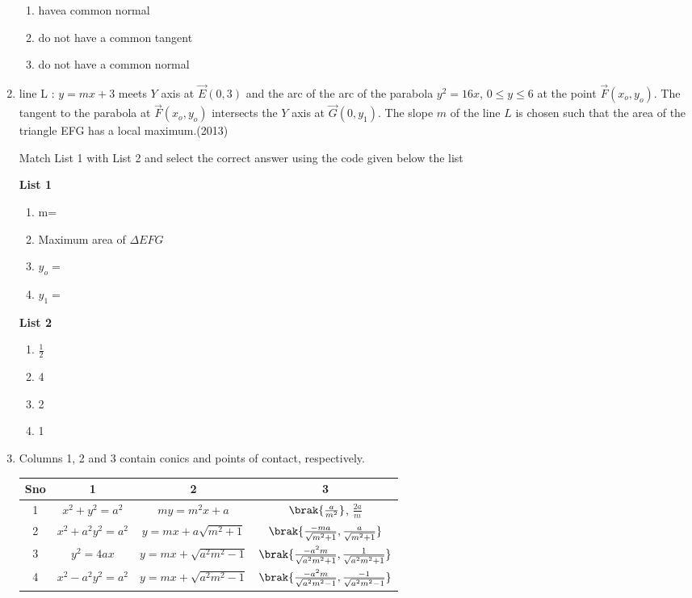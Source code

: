 \begin{enumerate}[label=\thesubsection.\arabic*.,ref=\thesubsection.\theenumi]
\begin{multicols}{2}
\begin{enumerate}
    \item havea common normal 
    \item do not have a common tangent
    \item do not have a common normal
\end{enumerate}
\end{multicols}
\item line L : $y = mx + 3$ meets $Y$ axis at $\vec{E}(0,3)$ and the arc of the arc of the parabola $y^2 = 16x$, $ 0\leq y \leq6$ at the point $\vec{F}(x_o,y_o)$. The tangent to the parabola at $\vec{F}(x_o,y_o)$ intersects the $Y$ axis at $\vec{G}(0,y_1)$. The slope $m$ of the line $L$ is chosen such that the area of the triangle EFG has a local maximum.\hfill{(2013)} 

Match List 1 with List 2 and select the correct answer using the code given below the list 
\begin{multicols}{2}
\textbf{List 1}
\begin{enumerate}
    \item m=
    \item Maximum area of $\Delta EFG$
    \item $y_o=$
    \item $y_1=$
\end{enumerate}
\textbf{List 2}
\begin{enumerate}
    \item $\frac{1}{2}$
    \item 4
    \item 2
    \item 1
\end{enumerate}
\end{multicols}
\item  Columns 1, 2 and 3 contain conics and points of contact, respectively.
\begin{table}[h!]
\centering
\begin{tabular}{|c|c|c|c|}
\hline
Sno & 1       & 2 & 3 \\
\hline
	1 & $x^2 + y^2 = a^2$ & $my = m^2x + a$ & $\brak{\frac{a}{m^2}}$, $\frac{2a}{m}$ \\
	2 & $x^2 + a^2y^2 = a^2  $      & $y = mx +a\sqrt{m^2 + 1}$  & $\brak{\frac{-ma}{\sqrt{m^2 + 1}},\frac{a}{\sqrt{m^2 + 1}}}   $   \\
	3 & $y^2=4ax $  & $y = mx + \sqrt{a^2m^2 - 1}$ & $\brak{\frac{-a^2m}{\sqrt{a^2m^2 + 1}}, \frac{1}{\sqrt{a^2m^2 + 1}}}$    \\
	4 & $x^2 - a^2y^2 = a^2$     & $y = mx + \sqrt{a^2m^2 - 1 }$  & $\brak{\frac{-a^2m}{\sqrt{a^2m^2 - 1}}, \frac{-1}{\sqrt{a^2m^2 - 1}}}$      \\


\end{tabular}
\end{table}
\end{enumerate}
